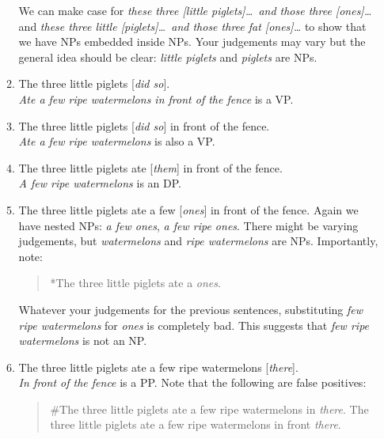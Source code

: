 \documentclass[a4paper,12pt]{article}
\begin{document}
\begin{enumerate}
\begin{enumerate}
         We can make case for \textit{these three [little piglets]\dots\ and those three [ones]\dots} and \textit{these three little [piglets]\dots\ and those three fat [ones]\dots} to show that we have NPs embedded inside NPs. Your judgements may vary but the general idea should be clear: \textit{little piglets} and \textit{piglets} are NPs.

         \item The three little piglets [\textit{did so}].\\
         \textit{Ate a few ripe watermelons in front of the fence} is a VP.

         \item The three little piglets [\textit{did so}] in front of the fence.\\
         \textit{Ate a few ripe watermelons} is also a VP.

         \item The three little piglets ate [\textit{them}] in front of the fence.\\
         \textit{A few ripe watermelons} is an DP.

         \item The three little piglets ate a few [\textit{ones}] in front of the fence.
         Again we have nested NPs: \textit{a few ones}, \textit{a few ripe ones}. There might be varying judgements, but \textit{watermelons} and \textit{ripe watermelons} are NPs. Importantly, note:

         \begin{quote}
            *The three little piglets ate a \textit{ones}.
         \end{quote}

         Whatever your judgements for the previous sentences, substituting \textit{few ripe watermelons} for \textit{ones} is completely bad. This suggests that \textit{few ripe watermelons} is not an NP.

         \newpage
         \item The three little piglets ate a few ripe watermelons [\textit{there}].\\
             \textit{In front of the fence} is a PP. Note that the following are false positives:

             \begin{quote}
               \#The three little piglets ate a few ripe watermelons in \textit{there}.
               \*The three little piglets ate a few ripe watermelons in front \textit{there}.
             \end{quote}


\end{enumerate}
\end{enumerate}
\end{document}
